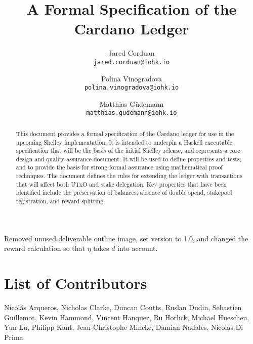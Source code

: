 
  \cleardoublepage%
  \tableofcontents%

  \listoffigures%
  \clearpage%

  \begin{changelog}
          {Removed unused deliverable outline image,
           set version to 1.0,
           and changed the reward calculation so that $\eta$
             takes $d$ into account.}
      \end{changelog}
      \clearpage%
\renewcommand{\thepage}{\arabic{page}}
\setcounter{page}{1}

\title{A Formal Specification of the Cardano Ledger}

\author{Jared Corduan  \\ {\small \texttt{jared.corduan@iohk.io}} \\
   \and Polina Vinogradova \\ {\small \texttt{polina.vinogradova@iohk.io}} \\
   \and Matthias G\"udemann  \\ {\small \texttt{matthias.gudemann@iohk.io}}}


\maketitle

\begin{abstract}
This document provides a formal specification of the Cardano ledger for use in the upcoming Shelley implementation.
It is intended to underpin a Haskell executable specification that will be the basis of the initial
Shelley release, and represents a core design and quality assurance document.
It will be used to define properties and tests, and to provide the basis for strong formal assurance
using mathematical proof techniques.
The document defines the rules for extending the ledger with transactions
that will affect both UTxO and stake delegation.
Key properties that have been identified include the preservation of balances, absence of double spend, stakepool registration,
and reward splitting.
\end{abstract}

\section*{List of Contributors}
\label{acknowledgements}

Nicol\'as Arqueros,
Nicholas Clarke,
Duncan Coutts,
Ruslan Dudin,
Sebastien Guillemot,
Kevin Hammond,
Vincent Hanquez,
Ru Horlick,
Michael Hueschen,
Yun Lu,
Philipp Kant,
Jean-Christophe Mincke,
Damian Nadales,
Nicolas Di Prima.
